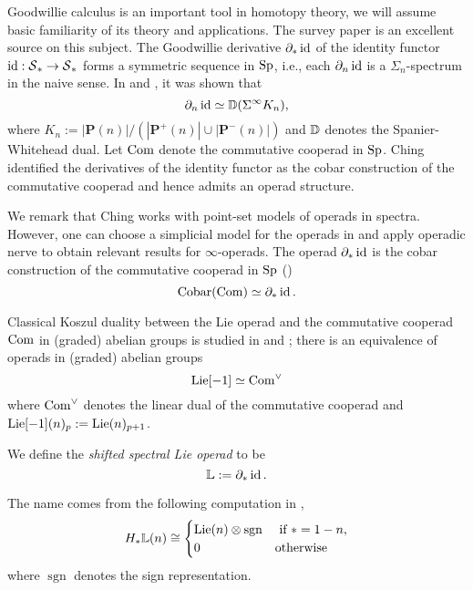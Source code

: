     Goodwillie calculus is an important tool in homotopy theory, we will assume basic familiarity of its theory and applications. The survey paper \cite{Aone-Ching_Survey} is an excellent source on this subject.
	The Goodwillie derivative $\partial_* \operatorname{id}$ of the identity functor $\operatorname{id}: \operatorname{\mathcal{S}}_* \to \operatorname{\mathcal{S}}_*$ forms a symmetric sequence in $\operatorname{Sp}$, i.e., each $\partial_n \operatorname{id}$ is a $\Sigma_n$-spectrum in the naive sense. In \cite{JohnsonDerivative} and \cite{Arone-Mahowald}, it was shown that
	$$
	\partial_n \operatorname{id} \simeq {\mathbb{D}}(\Sigma^{\infty} K_n),
	$$
	where 
	$
	K_{n}:=|\mathbf{P}(n)| /\left(\left|\mathbf{P}^{+}(n)\right| \cup\left|\mathbf{P}^{-}(n)\right|\right)
	$
	and ${\mathbb{D}}$ denotes the Spanier-Whitehead dual. 
	Let $\operatorname{Com}$ denote the commutative cooperad in $\operatorname{Sp}$.
	Ching \cite{ChingBar} identified the derivatives of the identity functor as the cobar construction of the commutative cooperad and hence admits an operad structure.
	\begin{remark}
	We remark that Ching works with point-set models of operads in spectra. However, one can choose a simplicial model for the operads in \cite{Ching_Bar-cobar} and apply operadic nerve \cite[Definition 2.1.1.23.]{HA}
	to obtain relevant results for $\infty$-operads.
	The operad $\partial_* \operatorname{id}$ is the cobar construction of the commutative cooperad in $\operatorname{Sp}$ (\cite[Remark 8.9]{ChingBar})
	$$
	\operatorname{Cobar}(\operatorname{Com})\simeq \partial_* \operatorname{id}.
	$$
	\end{remark}
	
	\begin{remark}
    Classical Koszul duality between the Lie operad and the commutative cooperad $\operatorname{Com}$ in (graded) abelian groups is studied in \cite{Ginzburg-Kapranov} and \cite{Loday-Vallette};
    there is an equivalence of operads in (graded) abelian groups
    \[
    \operatorname{Lie}[-1] \simeq \operatorname{Com}^{\vee}
    \]
    where $\operatorname{Com}^{\vee}$ denotes the linear dual of the commutative cooperad and $\operatorname{Lie}[-1](n)_p:=\operatorname{Lie}(n)_{p+1}$.
    \end{remark}
    
	\begin{definition}
	\label{Shifted Spectral Lie Operad}
	    	We define the \emph{shifted spectral Lie operad} to be
	    	$$
	    	{\mathbb{L}}:= \partial_* \operatorname{id}.
	    	$$
	\end{definition}

	The name comes from the following computation in \cite[Example 9.50]{ChingBar},
	$$
	H_{*}{\mathbb{L}}(n) \cong 	
	\begin{cases}
	\operatorname{Lie}(n) \otimes \operatorname{sgn}& \text{ if $*=1-n$},\\
	0 & \text{otherwise}
	\end{cases}
	$$	
	where $\operatorname{sgn}$ denotes the sign representation.


